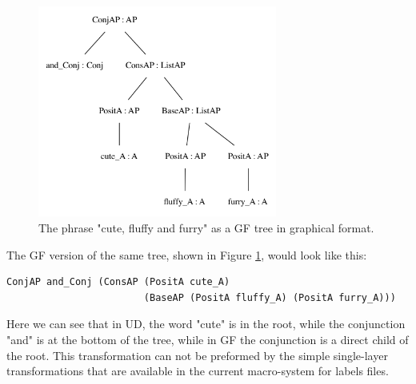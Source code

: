 \documentclass{article}
\begin{document}
\begin{figure}
    \centering
    \includegraphics[width=0.7\textwidth]{cute_gf.png}
    \caption{The phrase "cute, fluffy and furry" as a GF tree in graphical format. }
    \label{fig:gf_cute}
\end{figure}

The GF version of the same tree, shown in Figure \ref{fig:gf_cute}, would look like this:

\begin{verbatim}
ConjAP and_Conj (ConsAP (PositA cute_A)
                        (BaseAP (PositA fluffy_A) (PositA furry_A)))
\end{verbatim}
Here we can see that in UD, the word "cute" is in the root, while the conjunction "and" is at the bottom of the tree, while in GF the conjunction is a direct child of the root. This transformation can not be preformed by the simple single-layer transformations that are available in the current macro-system for labels files.

%
%
%


\end{document}
